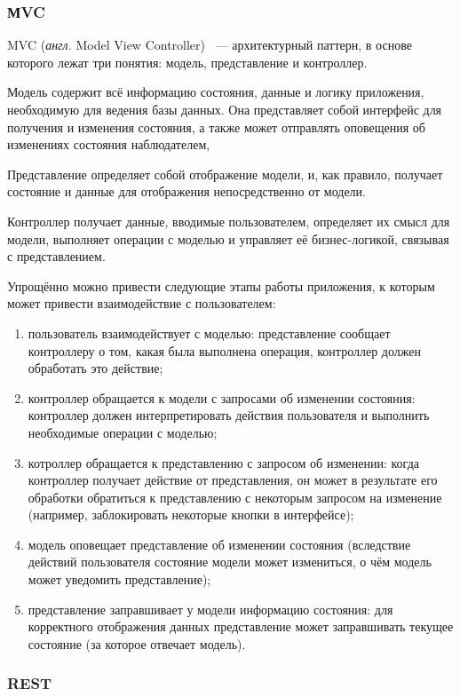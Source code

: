 \subsubsection{МVC}

MVC (\textit{англ.} Model View Controller)~\cite{mvc} --- архитектурный паттерн, в основе которого лежат  три понятия: модель, представление и контроллер.

Модель содержит всё информацию состояния, данные и логику приложения, необходимую для ведения базы данных.
Она представляет собой интерфейс для получения и изменения состояния, а также может отправлять оповещения об изменениях состояния наблюдателем, 

Представление определяет собой отображение модели, и, как правило, получает состояние и данные для отображения непосредственно от модели. 

Контроллер получает данные, вводимые пользователем, определяет их смысл для модели, выполняет операции с моделью и управляет её бизнес-логикой, связывая с представлением.

Упрощённо можно привести следующие этапы работы приложения, к которым может привести взаимодействие с пользователем:
\begin{enumerate}[label=\arabic*)]
	\item пользователь взаимодействует с моделью: представление сообщает контроллеру о том, какая была выполнена операция, контроллер должен обработать это действие;
	\item контроллер обращается к модели с запросами об изменении состояния: контроллер должен интерпретировать действия пользователя и выполнить необходимые операции с моделью;
	\item котроллер обращается к представлению с запросом об изменении: когда контроллер получает действие от представления, он может в результате его обработки обратиться к представлению с некоторым запросом на изменение (например, заблокировать некоторые кнопки в интерфейсе);
	\item модель оповещает представление об изменении состояния (вследствие действий пользователя состояние модели может измениться, о чём модель может уведомить представление);
	\item представление заправшивает у модели информацию состояния: для корректного отображения данных представление может заправшивать текущее состояние (за которое отвечает модель).
\end{enumerate}

\subsubsection{REST}

